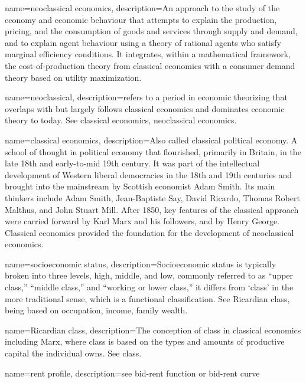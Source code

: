 {
name=neoclassical economics,
description={An approach to the study of the economy and economic behaviour that attempts to explain the production, pricing, and the consumption of goods and services through supply and demand, and to explain agent behaviour using a theory of rational agents who satisfy \gls{marginal} efficiency conditions. It integrates, within a mathematical framework, the cost-of-production theory from classical economics with a consumer demand theory based on utility maximization.}
}


{
name=neoclassical,
description={refers to a period in economic theorizing that overlaps with  but largely follows classical economics and dominates economic theory to  today. See \gls{classical economics}, \gls{neoclassical economics}.}
}

{
name=classical economics,
description={Also called classical \gls{political economy}. A school of thought in political economy that flourished, primarily in Britain, in the late 18th and early-to-mid 19th century. It was part of the intellectual  development of  Western liberal democracies in the 18th and 19th centuries and  brought into the mainstream by Scottish economist Adam Smith. Its main thinkers include Adam Smith, Jean-Baptiste Say, David Ricardo, Thomas Robert Malthus, and John Stuart Mill. After 1850, key features of the classical approach were carried forward by  Karl Marx and his followers, and by Henry George. Classical economics  provided the foundation for the development of \gls{neoclassical economics}.}
}

{
name=socioeconomic status,
description={Socioeconomic status is typically broken into three levels, high, middle, and low,  commonly referred to as ``upper class,'' ``middle class,'' and ``working or lower class,'' it differs from `\gls{class}' in the more traditional sense, which is a functional classification. See \gls{Ricardian class}, being based on occupation, income, family wealth.}
}

{
name=Ricardian class,
description={The conception of class in \gls{classical economics} including Marx, where class is based on the types and amounts of productive capital the individual owns. See \gls{class}.}
}

{
name=rent profile,
description={see \gls{bid-rent function} or \gls{bid-rent curve}}
}

